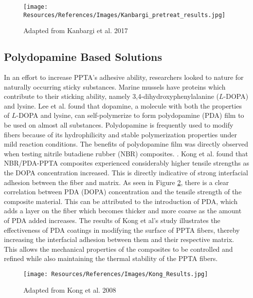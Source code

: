 \documentclass[12pt]{article}
\begin{document}
\begin{multicols}{2}
\begin{figure}[H]
    \centering
    \texttt{[image: Resources/References/Images/Kanbargi\_pretreat\_results.jpg]}
    \caption{\scriptsize{Adapted from Kanbargi et al. 2017 \citep{Kanbargi2017}}}
    \label{fig:Kanbargi_Results}
\end{figure}

\subsection{Polydopamine Based Solutions}

\indent In an effort to increase PPTA's adhesive ability, researchers looked to nature for naturally occurring sticky substances. Marine mussels have proteins which contribute to their sticking ability, namely 3,4-dihydroxyphenylalanine ($L$-DOPA) and lysine. \citep{Waite2001} Lee et al. \citep{Lee2007} found that dopamine, a molecule with both the properties of $L$-DOPA and lysine, can self-polymerize to form polydopamine (PDA) film to be used on almost all substances. \citep{Yuan2017} Polydopamine is frequently used to modify fibers because of its hydrophilicity and stable polymerization properties under mild reaction conditions. The benefits of polydopamine film was directly observed when testing nitrile butadiene rubber (NBR) composites. \citep{Kong2018}. Kong et al. \citep{Kong2018} found that NBR/PDA-PPTA composites experienced considerably higher tensile strengths as the DOPA concentration increased. This is directly indicative of strong interfacial adhesion between the fiber and matrix. As seen in Figure \ref{fig:Kong_Results}, there is a clear correlation between PDA (DOPA) concentration and the tensile strength of the composite material. This can be attributed to the introduction of PDA, which adds a layer on the fiber which becomes thicker and more coarse as the amount of PDA added increases. The results of Kong et al's \citep{Kong2018} study illustrates the effectiveness of PDA coatings in modifying the surface of PPTA fibers, thereby increasing the interfacial adhesion between them and their respective matrix. This allows the mechanical properties of the composites to be controlled and refined while also maintaining the thermal stability of the PPTA fibers. 

\begin{figure}[H]
    \centering
    \texttt{[image: Resources/References/Images/Kong\_Results.jpg]}
    \caption{\scriptsize{Adapted from Kong et al. 2008 \citep{Kong2018}}}
    \label{fig:Kong_Results}
\end{figure}


\end{multicols}
\end{document}
